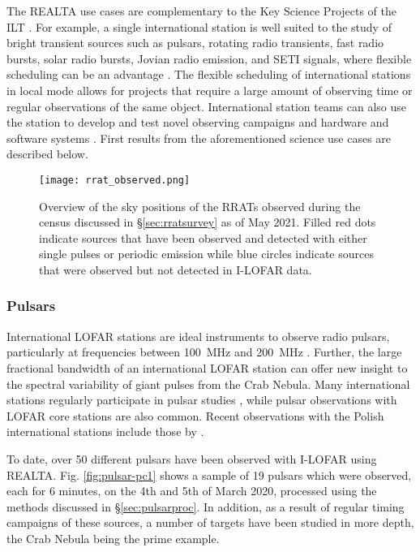 The REALTA use cases are complementary to the Key Science Projects of the ILT \citep[KSP; see][]{VanHaarlem2013}. For example, a single international station is well suited to the study of bright transient sources such as pulsars, rotating radio transients, fast radio bursts, solar radio bursts, Jovian radio emission, and SETI signals, where flexible scheduling can be an advantage \citep[for example,][]{Maguire2020, Morosan2019}. The flexible scheduling of international stations in local mode allows for projects that require a large amount of observing time or regular observations of the same object. International station teams can also use the station to develop and test novel observing campaigns and hardware and software systems \citep[for example,][]{Scully2021}. First results from the aforementioned science use cases are described below.

\begin{figure*}[t]
    \centering
    \texttt{[image: rrat\_observed.png]}
    \caption[Overview of the sky positions of RRATs observed during RRAT census.]{Overview of the sky positions of the RRATs observed during the census discussed in \S \ref{sec:rratsurvey} as of May 2021. Filled red dots indicate sources that have been observed and detected with either single pulses or periodic emission while blue circles indicate sources that were observed but not detected in I-LOFAR data.}
    \label{fig:rrat-pc1}
\end{figure*}

\subsubsection{Pulsars}

International LOFAR stations are ideal instruments to observe radio pulsars, particularly at frequencies between 100~MHz and 200~MHz \citep{Stappers2011, Bilous2014, Noutsos2015}. Further, the large fractional bandwidth of an international LOFAR station can offer new insight to the spectral variability of giant pulses from the Crab Nebula. Many international stations regularly participate in pulsar studies \citep[for example,][]{Mereghetti2016, Bondonneau2017, Hermsen2018, Donner2019}, while pulsar observations with LOFAR core stations \citep[for example,][]{Bilous2014, Bilous2020} are also common. Recent observations with the Polish international stations include those by \cite{Blaszkiewicz2020}. 

To date, over 50 different pulsars have been observed with I-LOFAR using REALTA. Fig. \ref{fig:pulsar-pc1} shows a sample of 19 pulsars which were observed, each for 6 minutes, on the 4th and 5th of March 2020, processed using the methods discussed in \S \ref{sec:pulsarproc}. In addition, as a result of regular timing campaigns of these sources, a number of targets have been studied in more depth, the Crab Nebula being the prime example. 


